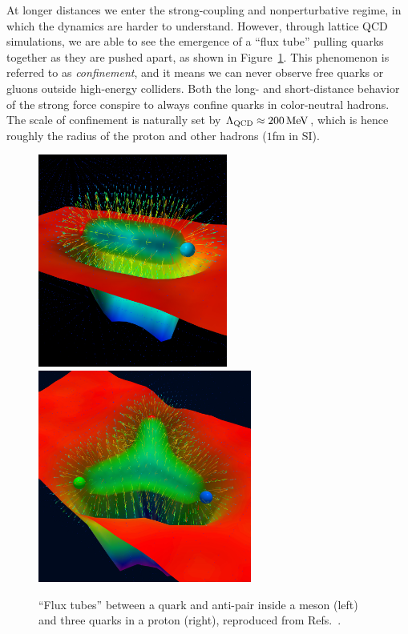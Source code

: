 At longer distances we enter the strong-coupling and nonperturbative regime, in which the dynamics are harder to understand.
However, through lattice QCD simulations, we are able to see the emergence of a ``flux tube'' pulling quarks together as they are pushed apart, as shown in Figure~\ref{fig:01_sm_qcd_fluxtubes}.
This phenomenon is referred to as \textit{confinement}, and it means we can never observe free quarks or gluons outside high-energy colliders.
Both the long- and short-distance behavior of the strong force conspire to always confine quarks in color-neutral hadrons.
The scale of confinement is naturally set by $\Lambda_\mathrm{QCD} \approx 200 \,\text{Me\hspace{-.08em}V}$, which is hence roughly the radius of the proton and other hadrons ($1$fm in SI).

\begin{figure}[ht]
	\centering
	\includegraphics[height=7cm]{figures/01-SM-03-SM/qcd/FluxTube.jpg}
	\hspace{2mm}
	\includegraphics[height=7cm]{figures/01-SM-03-SM/qcd/VacuumRespAction16t32_YshapeCSSMcover.jpg}
	\caption{``Flux tubes'' between a quark and anti-pair inside a meson (left) and three quarks in a proton (right), reproduced from Refs.~\cite{Bissey:2006bz, LeinweberVisualQCD}.}
	\label{fig:01_sm_qcd_fluxtubes}
\end{figure}


